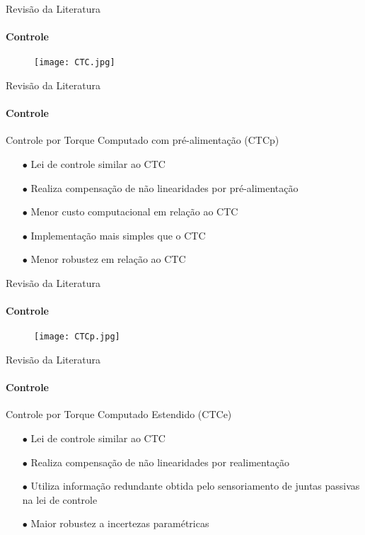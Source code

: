 \documentclass[25pt,landscape]{beamer}
\begin{document}
\begin{frame}{Revisão da Literatura}
    \framesubtitle{Controle}
    \begin{figure}[!h]
        \centering
        \texttt{[image: CTC.jpg]}
    \end{figure}  
\end{frame}

\begin{frame}{Revisão da Literatura}
    \framesubtitle{Controle}
    \begin{block}{Controle por Torque Computado com pré-alimentação (CTCp)}
        \begin{itemize}
            \item[$\bullet$] Lei de controle similar ao CTC \\[8pt]
            \item[$\bullet$] Realiza compensação de não linearidades por pré-alimentação \\[8pt]
            \item[$\bullet$] Menor custo computacional em relação ao CTC \\[8pt]
            \item[$\bullet$] Implementação mais simples que o CTC \\[8pt]
            \item[$\bullet$] Menor robustez em relação ao CTC \\[8pt]
        \end{itemize}
    \end{block}
\end{frame}

\begin{frame}{Revisão da Literatura}
    \framesubtitle{Controle}
    \begin{figure}[!h]
        \centering
        \texttt{[image: CTCp.jpg]}
    \end{figure}  
\end{frame}

\begin{frame}{Revisão da Literatura}
    \framesubtitle{Controle}
    \begin{block}{Controle por Torque Computado Estendido (CTCe)}
        \begin{itemize}
            \item[$\bullet$] Lei de controle similar ao CTC \\[8pt]
            \item[$\bullet$] Realiza compensação de não linearidades por realimentação \\[8pt]
            \item[$\bullet$] Utiliza informação redundante obtida pelo sensoriamento de juntas passivas na lei de controle \\[8pt]
            \item[$\bullet$] Maior robustez a incertezas paramétricas \\[8pt]
        \end{itemize}
    \end{block}
\end{frame}
\end{document}
